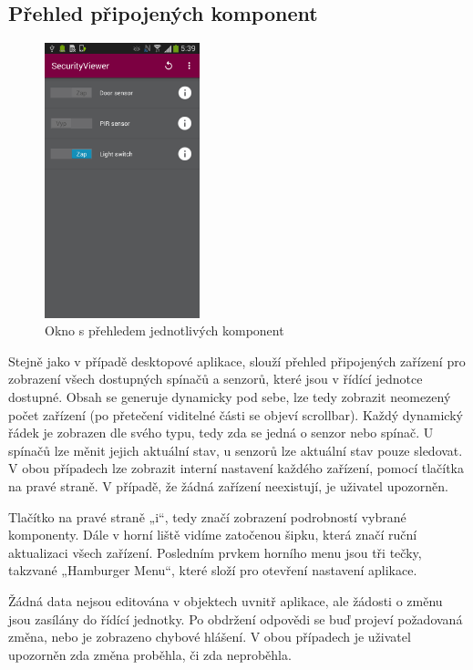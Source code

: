 \documentclass[FM,DP]{tulthesis}  %
\begin{document}
\subsection{Přehled připojených komponent}
\begin{figure}[H]
\begin{center}
\includegraphics[width=0.4\textwidth]{images/app1.png}
\caption{Okno s přehledem jednotlivých komponent}
\label{image}
\end{center}
\end{figure}

Stejně jako v případě desktopové aplikace, slouží přehled připojených zařízení pro zobrazení všech dostupných spínačů a senzorů, které jsou v řídící jednotce dostupné. Obsah se generuje dynamicky pod sebe, lze tedy zobrazit neomezený počet zařízení (po přetečení viditelné části se objeví scrollbar). Každý dynamický řádek je zobrazen dle svého typu, tedy zda se jedná o senzor nebo spínač. U spínačů lze měnit jejich aktuální stav, u senzorů lze aktuální stav pouze sledovat. V obou případech lze zobrazit interní nastavení každého zařízení, pomocí tlačítka na pravé straně. V případě, že žádná zařízení neexistují, je uživatel upozorněn.

Tlačítko na pravé straně „i“, tedy značí zobrazení podrobností vybrané komponenty. Dále v horní liště vidíme zatočenou šipku, která značí ruční aktualizaci všech zařízení. Posledním prvkem horního menu jsou tři tečky, takzvané „Hamburger Menu“, které složí pro otevření nastavení aplikace.

Žádná data nejsou editována v objektech uvnitř aplikace, ale žádosti o změnu jsou zasílány do řídící jednotky. Po obdržení odpovědi se buď projeví požadovaná změna, nebo je zobrazeno chybové hlášení. V obou případech je uživatel upozorněn zda změna proběhla, či zda neproběhla.
\end{document}
